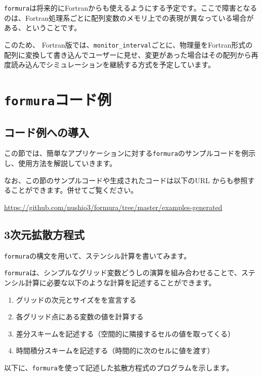 \documentclass{jsarticle}
\newcommand{\formura}{{\texttt{formura}}}
\begin{document}
\formura は将来的にFortranからも使えるようにする予定です。ここで障害となるのは、Fortran処理系ごとに配列変数のメモリ上での表現が異なっている場合がある、ということです。

このため、
Fortran版では、\verb`monitor_interval`ごとに、物理量をFortran形式の配列に変換して書き込んでユーザーに見せ、変更があった場合はその配列から再度読み込んでシミュレーションを継続する方式を予定しています。

\newpage
\section{\formura コード例}

\subsection{コード例への導入}

この節では、簡単なアプリケーションに対する\formura のサンプルコードを例示し、使用方法を解説していきます。

なお、この節のサンプルコードや生成されたコードは以下のURL
からも参照することができます。併せてご覧ください。

\href{https://github.com/nushio3/formura/tree/master/examples-generated}
{https://github.com/nushio3/formura/tree/master/examples-generated}


\subsection{3次元拡散方程式}

\formura の構文を用いて、ステンシル計算を書いてみます。


\formura は、シンプルなグリッド変数どうしの演算を組み合わせることで、ステンシル計算に必要な以下のような計算を記述することができます。

\begin{enumerate}
\item グリッドの次元とサイズをを宣言する
\item 各グリッド点にある変数の値を計算する
\item 差分スキームを記述する（空間的に隣接するセルの値を取ってくる）
\item 時間積分スキームを記述する（時間的に次のセルに値を渡す）
\end{enumerate}


以下に、\formura を使って記述した拡散方程式のプログラムを示します。
\end{document}

